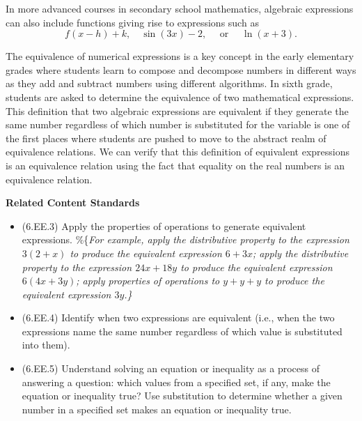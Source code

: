 \documentclass[
]{book}
\providecommand{\tightlist}{%
  \setlength{\itemsep}{0pt}\setlength{\parskip}{0pt}}
\newenvironment{standards}{}{}
\theoremstyle{definition}
\theoremstyle{definition}
\theoremstyle{definition}
\theoremstyle{definition}
\theoremstyle{remark}
\begin{document}
In more advanced courses in secondary school mathematics, algebraic expressions can also include functions giving rise to expressions such as
\[f(x-h)+k, \quad \sin(3x)-2, \quad \mbox{ or } \quad  \ln(x+3).\]

The equivalence of numerical expressions is a key concept in the early elementary grades where students learn to compose and decompose numbers in different ways as they add and subtract numbers using different algorithms. In sixth grade, students are asked to determine the equivalence of two mathematical expressions. This definition that two algebraic expressions are equivalent if they generate the same number regardless of which number is substituted for the variable is one of the first places where students are pushed to move to the abstract realm of equivalence relations. We can verify that this definition of equivalent expressions is an equivalence relation using the fact that equality on the real numbers is an equivalence relation.

\begin{standards}

\begin{center}
\textbf{Related Content Standards}

\end{center}

\begin{itemize}
\tightlist
\item
  (6.EE.3) Apply the properties of operations to generate equivalent expressions. \%\{\em For example, apply the distributive property to the expression $3 (2 + x)$ to produce the equivalent expression $6 + 3x$; apply the distributive property to the expression $24x + 18y$ to produce the equivalent expression $6 (4x + 3y)$; apply properties of operations to $y + y + y$ to produce the equivalent expression $3y$.\}
\item
  (6.EE.4) Identify when two expressions are equivalent (i.e., when the two expressions name the same number regardless of which value is substituted into them).
\item
  (6.EE.5) Understand solving an equation or inequality as a process of answering a question: which values from a specified set, if any, make the equation or inequality true? Use substitution to determine whether a given number in a specified set makes an equation or inequality true.
\end{itemize}

\end{standards}
\end{document}
